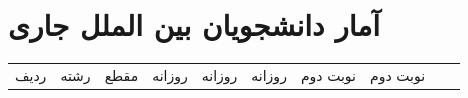 \documentclass[
  letterpaper,
  DIV=11,
  numbers=noendperiod]{scrreprt}
\newcounter{none} %
\begin{document}
\section{آمار دانشجویان بین الملل
جاری}\label{ux622ux645ux627ux631-ux62fux627ux646ux634ux62cux648ux6ccux627ux646-ux628ux6ccux646-ux627ux644ux645ux644ux644-ux62cux627ux631ux6cc}

\hspace{0pt}

{\def\LTcaptype{none} %
\begin{longtable}[]{@{}
  >{\raggedright\arraybackslash}p{}
  >{\raggedright\arraybackslash}p{}
  >{\raggedright\arraybackslash}p{}
  >{\raggedright\arraybackslash}p{}
  >{\raggedright\arraybackslash}p{}
  >{\raggedright\arraybackslash}p{}
  >{\raggedright\arraybackslash}p{}
  >{\raggedright\arraybackslash}p{}
  >{\raggedright\arraybackslash}p{}
  >{\raggedright\arraybackslash}p{}@{}}
\toprule\noalign{}
\begin{minipage}[b]{\linewidth}\raggedright
ردیف
\end{minipage} & \begin{minipage}[b]{\linewidth}\raggedright
رشته
\end{minipage} & \begin{minipage}[b]{\linewidth}\raggedright
مقطع
\end{minipage} & \begin{minipage}[b]{\linewidth}\raggedright
روزانه
\end{minipage} & \begin{minipage}[b]{\linewidth}\raggedright
روزانه
\end{minipage} & \begin{minipage}[b]{\linewidth}\raggedright
روزانه
\end{minipage} & \begin{minipage}[b]{\linewidth}\raggedright
نوبت دوم
\end{minipage} & \begin{minipage}[b]{\linewidth}\raggedright
نوبت دوم
\end{minipage} & \begin{minipage}[b]{\linewidth}\raggedright

\end{minipage}
\end{longtable}}
\end{document}
